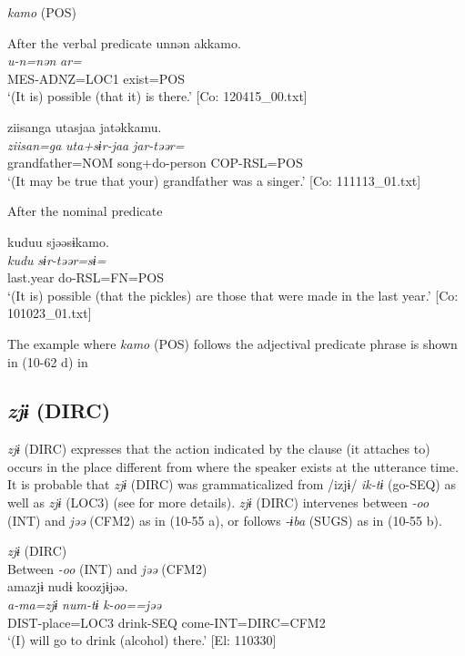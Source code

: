 \ea\label{ex:10.54}   \textit{kamo} (POS)\\
  \begin{xlist}
  \exi{} After the verbal predicate
  \ex  %
      \glll    unnən  akkamo.\\
      \textit{u-n=nən}  \textit{ar=}\\
      MES-ADNZ=LOC1  exist=POS\\
      \glt       ‘(It is) possible (that it) is there.’ [Co: 120415\_00.txt]

  \ex  %
      \glll    ziisanga  utasjaa  jatəkkamu.\\
      \textit{ziisan=ga}  \textit{uta+sɨr-jaa}  \textit{jar-təər=}\\
      grandfather=NOM  song+do-person  COP-RSL=POS\\
      \glt       ‘(It may be true that your) grandfather was a singer.’ [Co: 111113\_01.txt]

  \exi{} After the nominal predicate

  \ex  %
      \glll    kuduu  sjəəsɨkamo.\\
      \textit{kudu}  \textit{sɨr-təər=sɨ=}\\
      last.year  do-RSL=FN=POS\\
      \glt       ‘(It is) possible (that the pickles) are those that were made in the last year.’ [Co: 101023\_01.txt]
    \end{xlist}
\z

The example where \textit{kamo} (POS) follows the adjectival predicate phrase is shown in (10-62 d) in  

\subsection{\textit{zjɨ} (DIRC)}\label{sec:10.3.9}

\textit{zjɨ} (DIRC) expresses that the action indicated by the clause (it attaches to) occurs in the place different from where the speaker exists at the utterance time. It is probable that \textit{zjɨ} (DIRC) was grammaticalized from /izjɨ/ \textit{ik-tɨ} (go-SEQ) as well as \textit{zjɨ} (LOC3) (see  for more details). \textit{zjɨ} (DIRC) intervenes between \textit{{}-oo} (INT) and \textit{jəə} (CFM2) as in (10-55 a), or follows \textit{{}-ɨba} (SUGS) as in (10-55 b).

\ea\label{ex:10.55}   \textit{zjɨ} (DIRC)\\
  \ea Between \textit{{}-oo} (INT) and \textit{jəə} (CFM2)\\
      \glll    amazjɨ  nudɨ  koozjɨjəə.\\
    \textit{a-ma=zjɨ}  \textit{num-tɨ}  \textit{k-oo==jəə}\\
    DIST-place=LOC3  drink-SEQ  come-INT=DIRC=CFM2\\
    \glt     ‘(I) will go to drink (alcohol) there.’ [El: 110330]

